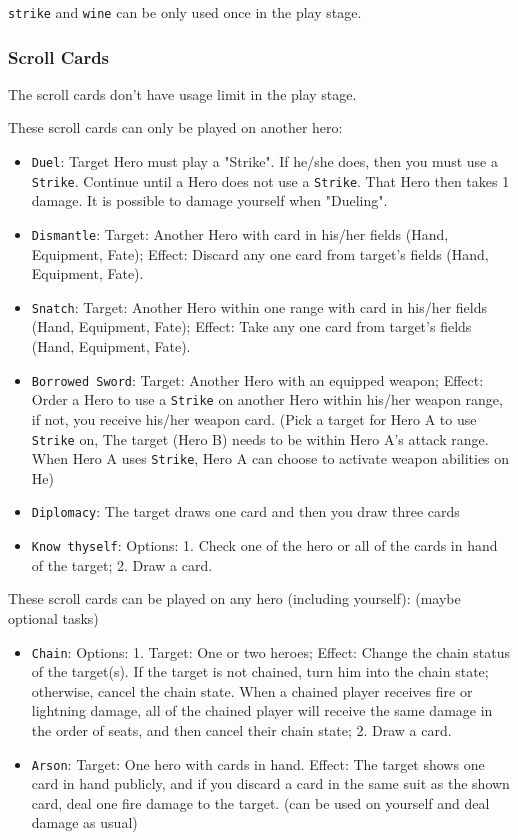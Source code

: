 \documentclass[11pt,a4paper]{article}
\begin{document}
\texttt{strike} and \texttt{wine} can be only used once in the play stage.

\subsubsection{Scroll Cards}

The scroll cards don't have usage limit in the play stage. \bigskip

These scroll cards can only be played on another hero:
\begin{itemize}
\item \texttt{Duel}: Target Hero must play a "Strike". If he/she does, then you must use a \texttt{Strike}. Continue until a Hero does not use a \texttt{Strike}. That Hero then takes 1 damage. It is possible to damage yourself when "Dueling".
\item \texttt{Dismantle}: Target: Another Hero with card in his/her fields (Hand, Equipment, Fate);
Effect: Discard any one card from target's fields (Hand, Equipment, Fate).
\item \texttt{Snatch}: Target: Another Hero within one range with card in his/her fields (Hand, Equipment, Fate);
Effect: Take any one card from target's fields (Hand, Equipment, Fate).
\item \texttt{Borrowed Sword}: Target: Another Hero with an equipped weapon; Effect: Order a Hero to use a \texttt{Strike} on another Hero within his/her weapon range, if not, you receive his/her weapon card. (Pick a target for Hero A to use \texttt{Strike} on, The target (Hero B) needs to be within Hero A's attack range. When Hero A uses \texttt{Strike}, Hero A can choose to activate weapon abilities on He)
\item \texttt{Diplomacy}: The target draws one card and then you draw three cards
\item \texttt{Know thyself}: Options: 1. Check one of the hero or all of the cards in hand of the target; 2. Draw a card.
\end{itemize}

These scroll cards can be played on any hero (including yourself): (maybe optional tasks)
\begin{itemize}
\item \texttt{Chain}: Options: 1. Target: One or two heroes; Effect: Change the chain status of the target(s). If the target is not chained, turn him into the chain state; otherwise, cancel the chain state. When a chained player receives fire or lightning damage, all of the chained player will receive the same damage in the order of seats, and then cancel their chain state; 2. Draw a card.
\item \texttt{Arson}: Target: One hero with cards in hand. Effect: The target shows one card in hand publicly, and if you discard a card in the same suit as the shown card, deal one fire damage to the target. (can be used on yourself and deal damage as usual)
\end{itemize}
\end{document}
